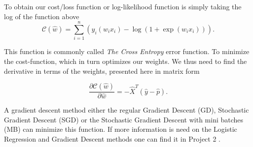 To obtain our cost/loss function or log-likelihood function is simply taking the log of the function above
\begin{equation}\label{eq:8}
    \mathcal{C}(\hat{w})=\sum_{i=1}^{n}\left(y_{i}\left(w_{i} x_{i}\right)-\log \left(1+\exp \left(w_{i} x_{i}\right)\right)\right).
\end{equation}

This function is commonly called \textit{The Cross Entropy} error function. To minimize the cost-function, which in turn optimizes our weights. We thus need to find the derivative in terms of the weights, presented here in matrix form

\begin{equation}\label{eq:10}
    \frac{\partial \mathcal{C}(\hat{w})}{\partial \hat{w}}=-\hat{X}^{T}(\hat{y}-\hat{p}).
\end{equation}

A gradient descent method either the regular Gradient Descent (GD), Stochastic Gradient Descent (SGD) or the Stochastic Gradient Descent with mini batches (MB) can minimize this function. If more information is need on the Logistic Regression and Gradient Descent methods one can find it in Project 2 \cite{Project2}.



